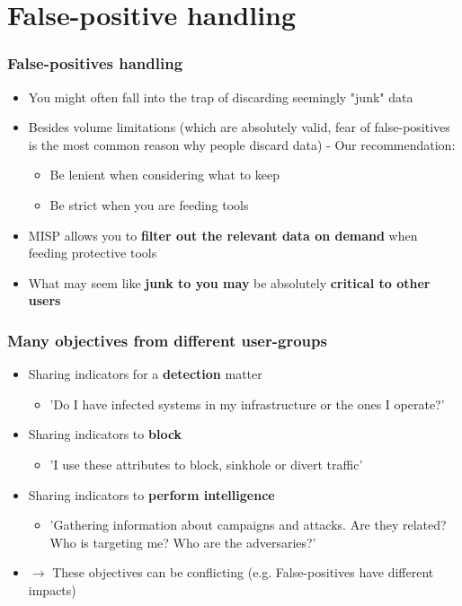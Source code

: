 \section{False-positive handling}

\begin{frame}
\frametitle{False-positives handling}
\begin{itemize}
	\item You might often fall into the trap of discarding seemingly "junk" data
	\item Besides volume limitations (which are absolutely valid, fear of false-positives is the most common reason why people discard data) - Our recommendation:
	\begin{itemize}
		\item Be lenient when considering what to keep
		\item Be strict when you are feeding tools
	\end{itemize}
\item MISP allows you to \textbf{filter out the relevant data on demand} when feeding protective tools
\item What may seem like \textbf{junk to you may} be absolutely \textbf{critical to other users}
\end{itemize}
\end{frame}

\begin{frame}
	\frametitle{Many objectives from different user-groups}
    \begin{itemize}
        \item Sharing indicators for a \textbf{detection} matter
        \begin{itemize}
            \item 'Do I have infected systems in my infrastructure or the ones I operate?'
        \end{itemize}
        \item Sharing indicators to \textbf{block}
        \begin{itemize}
            \item 'I use these attributes to block, sinkhole or divert traffic'
		\end{itemize}
		\item Sharing indicators to \textbf{perform intelligence}
		\begin{itemize}
			\item 'Gathering information about campaigns and attacks. Are they related? Who is targeting me? Who are the adversaries?'
		\end{itemize}
		\item $\rightarrow$ These objectives can be conflicting (e.g. False-positives have different impacts)
	\end{itemize}
\end{frame}

